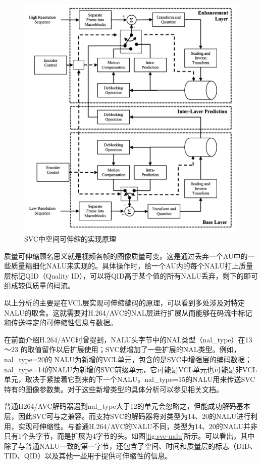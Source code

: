 \begin{figure}[!ht]
	\centering
	\includegraphics[width = 1.0\linewidth]{figures/spatial-svc.png}
	\caption{SVC中空间可伸缩的实现原理\label{fig:spatial-svc}}
\end{figure}

质量可伸缩顾名思义就是视频各帧的图像质量可变。这是通过丢弃一个AU中的一些质量精细化NALU来实现的。具体操作时，给一个AU内的每个NALU打上质量层标记QID（Quality ID），可以将QID高于某个值的所有NALU丢弃，剩下的即可组成较低质量的码流。

以上分析的主要是在VCL层实现可伸缩编码的原理，可以看到多处涉及对特定
NALU的取舍。这就需要对H.264/AVC的NAL层进行扩展从而能够在码流中标记和传送特定的可伸缩性信息与数据。

在前面介绍H.264/AVC时曾提到，NALU头字节中的NAL类型（nal\_type）在13～23
的取值留作以后扩展使用；SVC就增加了一些扩展的NAL类型。例如，nal\_type=20的
NALU为新增的VCL单元，包含的是SVC中增强层的编码数据；nal\_type=14的NALU为新增的SVC前缀单元，它可能是VCL单元也可能是非VCL单元，取决于紧接着它到来的下一个NALU。nal\_type=15的NALU用来传送SVC特有的图像参数集。对于这些新增类型的具体分析可以参见相关文档\supercite{SVC-Interface}。

普通H264/AVC解码器遇到nal\_type大于12的单元会忽略之，但能成功解码基本层，因此SVC可与之兼容。而支持SVC的解码器将对类型为14、20的NALU进行利用，实现可伸缩性。与普通H.264/AVC的NALU不同，类型为14、20的NALU并非只有1个头字节，而是扩展为4字节的头。如图\ref{fig:svc-nalu}\supercite{SVC-Interface}所示。可以看出，其中除了与普通NALU一致的第一字节，还包含了空间、时间和质量层的标志（DID、TID、QID）以及其他一些用于提供可伸缩性的信息。

